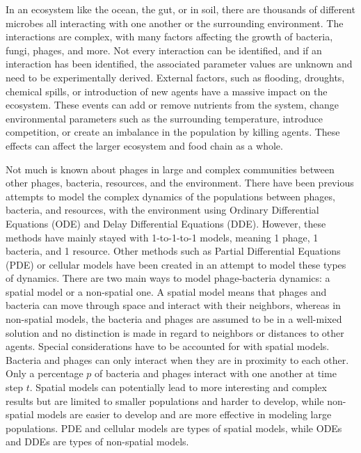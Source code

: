 In an ecosystem like the ocean, the gut, or in soil, there are thousands of different microbes all interacting with one another or the surrounding environment.
The interactions are complex, with many factors affecting the growth of bacteria, fungi,  phages, and more. 
Not every interaction can be identified, and if an interaction has been identified, the associated parameter values are unknown and need to be experimentally derived. 
External factors, such as flooding, droughts, chemical spills, or introduction of new agents have a massive impact on the ecosystem. 
These events can add or remove nutrients from the system, change environmental parameters such as the surrounding temperature, introduce competition, or create an imbalance in the population by killing agents. 
These effects can affect the larger ecosystem and food chain as a whole. \newline

Not much is known about phages in large and complex communities between other phages, bacteria, resources, and the environment. 
There have been previous attempts to model the complex dynamics of the populations between phages, bacteria, and resources, with the environment using Ordinary Differential Equations (ODE) and Delay Differential Equations (DDE).
However, these methods have mainly stayed with 1-to-1-to-1 models, meaning 1 phage, 1 bacteria, and 1 resource.
Other methods such as Partial Differential Equations (PDE) or cellular models have been created in an attempt to model these types of dynamics.
There are two main ways to model phage-bacteria dynamics: a spatial model or a non-spatial one.
A spatial model means that phages and bacteria can move through space and interact with their neighbors, whereas in non-spatial models, the bacteria and phages are assumed to be in a well-mixed solution and no distinction is made in regard to neighbors or distances to other agents. 
Special considerations have to be accounted for with spatial models.
Bacteria and phages can only interact when they are in proximity to each other.
Only a percentage $p$ of bacteria and phages interact with one another at time step $t$.
Spatial models can potentially lead to more interesting and complex results but are limited to smaller populations and harder to develop, while non-spatial models are easier to develop and are more effective in modeling large populations.
PDE and cellular models are types of spatial models, while ODEs and DDEs are types of non-spatial models. \newline 


